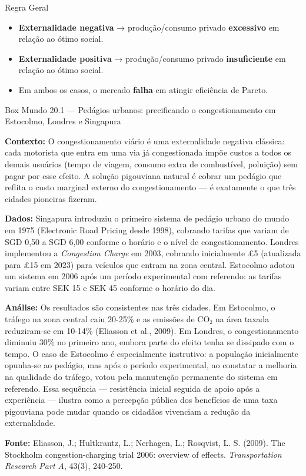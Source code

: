 \documentclass[11pt,twoside,openright]{book}
\providecommand{\tightlist}{\setlength{\itemsep}{0pt}\setlength{\parskip}{0pt}}
\begin{document}
\begin{tipbox}{Regra Geral}

\begin{itemize}
\tightlist
\item
  \textbf{Externalidade negativa} → produção/consumo privado
  \textbf{excessivo} em relação ao ótimo social.
\item
  \textbf{Externalidade positiva} → produção/consumo privado
  \textbf{insuficiente} em relação ao ótimo social.
\item
  Em ambos os casos, o mercado \textbf{falha} em atingir eficiência de
  Pareto.
\end{itemize}

\end{tipbox}

\begin{boxmundobox}{Box Mundo 20.1 — Pedágios urbanos: precificando o congestionamento em Estocolmo, Londres e Singapura}

\textbf{Contexto:} O congestionamento viário é uma externalidade
negativa clássica: cada motorista que entra em uma via já congestionada
impõe custos a todos os demais usuários (tempo de viagem, consumo extra
de combustível, poluição) sem pagar por esse efeito. A solução
pigouviana natural é cobrar um pedágio que reflita o custo marginal
externo do congestionamento --- é exatamente o que três cidades
pioneiras fizeram.

\textbf{Dados:} Singapura introduziu o primeiro sistema de pedágio
urbano do mundo em 1975 (Electronic Road Pricing desde 1998), cobrando
tarifas que variam de SGD 0,50 a SGD 6,00 conforme o horário e o nível
de congestionamento. Londres implementou a \emph{Congestion Charge} em
2003, cobrando inicialmente £5 (atualizada para £15 em 2023) para
veículos que entram na zona central. Estocolmo adotou um sistema em 2006
após um período experimental com referendo: as tarifas variam entre SEK
15 e SEK 45 conforme o horário do dia.

\textbf{Análise:} Os resultados são consistentes nas três cidades. Em
Estocolmo, o tráfego na zona central caiu 20-25\% e as emissões de CO₂
na área taxada reduziram-se em 10-14\% (Eliasson et al., 2009). Em
Londres, o congestionamento diminuiu 30\% no primeiro ano, embora parte
do efeito tenha se dissipado com o tempo. O caso de Estocolmo é
especialmente instrutivo: a população inicialmente opunha-se ao pedágio,
mas após o período experimental, ao constatar a melhoria na qualidade do
tráfego, votou pela manutenção permanente do sistema em referendo. Essa
sequência --- resistência inicial seguida de apoio após a experiência
--- ilustra como a percepção pública dos benefícios de uma taxa
pigouviana pode mudar quando os cidadãos vivenciam a redução da
externalidade.

\textbf{Fonte:} Eliasson, J.; Hultkrantz, L.; Nerhagen, L.; Rosqvist, L.
S. (2009). The Stockholm congestion-charging trial 2006: overview of
effects. \emph{Transportation Research Part A}, 43(3), 240-250.

\end{boxmundobox}
\end{document}
